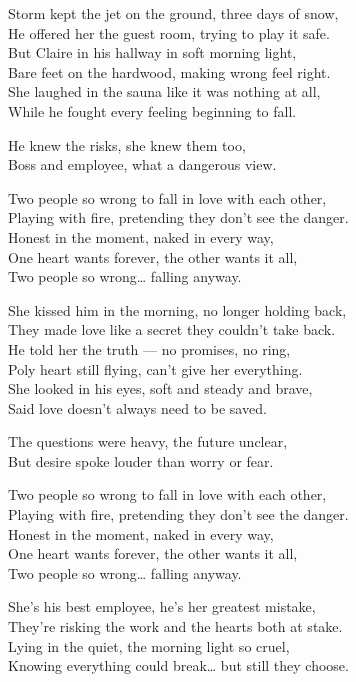\begin{lyrics}
Storm kept the jet on the ground, three days of  snow,\\
He offered her the guest room, trying to play it safe.\\
But Claire in his hallway in soft morning light,\\
Bare feet on the hardwood, making wrong feel right.\\
She laughed in the sauna like it was nothing at all,\\
While he fought every feeling beginning to fall.

He knew the risks, she knew them too,\\
Boss and employee, what a dangerous view.

Two people so wrong to fall in love with each other,\\
Playing with fire, pretending they don’t see the danger.\\
Honest in the moment, naked in every way,\\
One heart wants forever, the other wants it all,\\
Two people so wrong… falling anyway.

She kissed him in the morning, no longer holding back,\\
They made love like a secret they couldn’t take back.\\
He told her the truth — no promises, no ring,\\
Poly heart still flying, can’t give her everything.\\
She looked in his eyes, soft and steady and brave,\\
Said love doesn’t always need to be saved.

The questions were heavy, the future unclear,\\
But desire spoke louder than worry or fear.

Two people so wrong to fall in love with each other,\\
Playing with fire, pretending they don’t see the danger.\\
Honest in the moment, naked in every way,\\
One heart wants forever, the other wants it all,\\
Two people so wrong… falling anyway.

She’s his best employee, he’s her greatest mistake,\\
They’re risking the work and the hearts both at stake.\\
Lying in the quiet, the morning light so cruel,\\
Knowing everything could break… but still they choose.


\end{lyrics}

